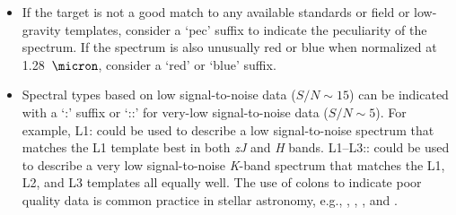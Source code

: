 \documentclass[modern,trackchanges]{aastex61}
\begin{document}
\begin{itemize}
	\item If the target is not a good match to any available standards or field or low-gravity templates, consider a `pec' suffix to indicate the peculiarity of the spectrum. If the spectrum is also unusually red or blue when normalized at 1.28~$\micron$, consider a `red' or `blue' suffix.
	\item Spectral types based on low signal-to-noise data ($S/N\sim15$) can be indicated with a `:' suffix or `::' for very-low signal-to-noise data ($S/N\sim5$).
    For example, L1: could be used to describe a low signal-to-noise spectrum that matches the L1 template best in both \emph{zJ} and \emph{H} bands. L1--L3:: could be used to describe a very low signal-to-noise \emph{K}-band spectrum that matches the L1, L2, and L3 templates all equally well.
	The use of colons to indicate poor quality data is common practice in stellar astronomy, e.g., \citet{Sanduleak:1988fn}, \cite{Silvestri:2006el}, \citet[Table 12.1]{Gray:2009wd}, and \cite{Covey:2010de}.

\end{itemize}

\end{document}
